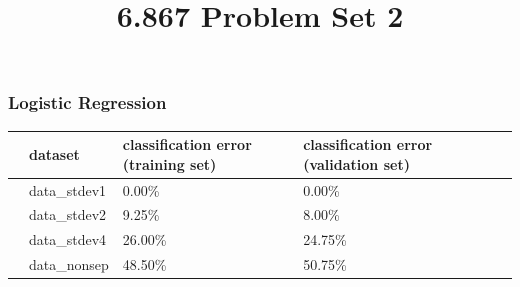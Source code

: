 \documentclass[10pt]{article}
\begin{document}
	\title{6.867 Problem Set 2}
	\maketitle


\subsubsection*{Logistic Regression}

\begin{table}
\begin{tabular}{llllll}
\toprule
{} & dataset & classification error (training set) & classification error (validation set) \\
\midrule
  & data\_stdev1 & 0.00\% & 0.00\% \\
  & data\_stdev2 & 9.25\% & 8.00\% \\
  & data\_stdev4 & 26.00\% & 24.75\% \\
  & data\_nonsep & 48.50\% & 50.75\% \\
\bottomrule
\end{tabular}
\end{table}
\end{document}
